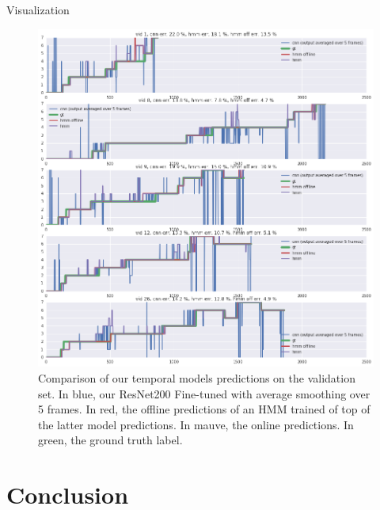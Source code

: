 \begin{frame}{Visualization}

	\begin{figure}
\begin{center}
   \includegraphics[width=1\linewidth]{../report/images/visu.png}
\end{center}
   \caption{Comparison of our temporal models predictions on the validation set. In blue, our ResNet200 Fine-tuned with average smoothing over 5 frames. In red, the offline predictions of an HMM trained of top of the latter model predictions. In mauve, the online predictions. In green, the ground truth label. }
\label{fig:long}
\label{fig:onecol}
\end{figure}	
	
\end{frame}


\section{Conclusion} \subsection{}\label{}

